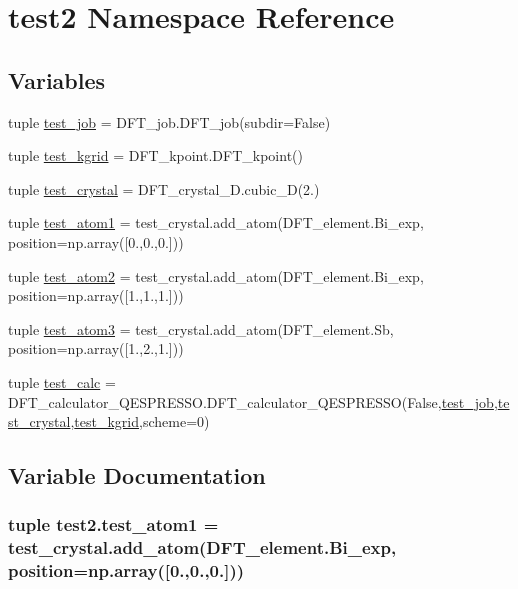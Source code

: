 \hypertarget{namespacetest2}{\section{test2 Namespace Reference}
\label{namespacetest2}
}
\subsection*{Variables}
\begin{DoxyCompactItemize}
\item 
tuple \hyperlink{namespacetest2_a7200f520502bf46d9abb4c2eb7c826e6}{test\+\_\+job} = D\+F\+T\+\_\+job.\+D\+F\+T\+\_\+job(subdir=False)
\item 
tuple \hyperlink{namespacetest2_afd90e2890ffb36417df41704abb37bee}{test\+\_\+kgrid} = D\+F\+T\+\_\+kpoint.\+D\+F\+T\+\_\+kpoint()
\item 
tuple \hyperlink{namespacetest2_a2e79ec3af6460f90aec23c3b7d0f18ba}{test\+\_\+crystal} = D\+F\+T\+\_\+crystal\+\_\+D.\+cubic\+\_\+D(2.)
\item 
tuple \hyperlink{namespacetest2_a07e7eb9fbacc9a130f6ee3dbaae5a463}{test\+\_\+atom1} = test\+\_\+crystal.\+add\+\_\+atom(D\+F\+T\+\_\+element.\+Bi\+\_\+exp, position=np.\+array(\mbox{[}0.,0.,0.\mbox{]}))
\item 
tuple \hyperlink{namespacetest2_aa91ed76e9a11db879c0f08f013ba6280}{test\+\_\+atom2} = test\+\_\+crystal.\+add\+\_\+atom(D\+F\+T\+\_\+element.\+Bi\+\_\+exp, position=np.\+array(\mbox{[}1.,1.,1.\mbox{]}))
\item 
tuple \hyperlink{namespacetest2_a186bceb4dd12340645a99dfdc5b6f8eb}{test\+\_\+atom3} = test\+\_\+crystal.\+add\+\_\+atom(D\+F\+T\+\_\+element.\+Sb, position=np.\+array(\mbox{[}1.,2.,1.\mbox{]}))
\item 
tuple \hyperlink{namespacetest2_a57918f605bcac36d83fb025476490d52}{test\+\_\+calc} = D\+F\+T\+\_\+calculator\+\_\+\+Q\+E\+S\+P\+R\+E\+S\+S\+O.\+D\+F\+T\+\_\+calculator\+\_\+\+Q\+E\+S\+P\+R\+E\+S\+S\+O(False,\hyperlink{namespacetest2_a7200f520502bf46d9abb4c2eb7c826e6}{test\+\_\+job},\hyperlink{namespacetest2_a2e79ec3af6460f90aec23c3b7d0f18ba}{test\+\_\+crystal},\hyperlink{namespacetest2_afd90e2890ffb36417df41704abb37bee}{test\+\_\+kgrid},scheme=0)
\end{DoxyCompactItemize}


\subsection{Variable Documentation}
\hypertarget{namespacetest2_a07e7eb9fbacc9a130f6ee3dbaae5a463}{
\subsubsection[{test\+\_\+atom1}]{\setlength{\rightskip}{0pt plus 5cm}tuple test2.\+test\+\_\+atom1 = test\+\_\+crystal.\+add\+\_\+atom(D\+F\+T\+\_\+element.\+Bi\+\_\+exp, position=np.\+array(\mbox{[}0.,0.,0.\mbox{]}))}}\label{namespacetest2_a07e7eb9fbacc9a130f6ee3dbaae5a463}


